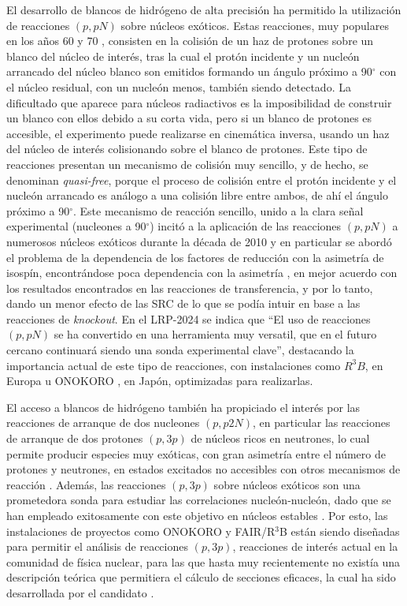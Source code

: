 \documentclass[a4paper,12pt,twoside]{article}
\begin{document}
El desarrollo de blancos de hidrógeno de alta precisión \cite{Obe14,Pan16,Liu23} ha permitido la utilización de reacciones $(p,pN)$ sobre núcleos exóticos. Estas reacciones, muy populares en los años 60 y 70 \cite{Jac66}, consisten en la colisión de un haz de protones sobre un blanco del núcleo de interés, tras la cual el protón incidente y un nucleón arrancado del núcleo blanco son emitidos formando un ángulo próximo a 90$^\circ$ con el núcleo residual, con un nucleón menos, también siendo detectado. La dificultado que aparece para núcleos radiactivos es la imposibilidad de construir un blanco con ellos debido a su corta vida, pero si un blanco de protones es accesible, el experimento puede realizarse en cinemática inversa, usando un haz del núcleo de interés colisionando sobre el blanco de protones. Este tipo de reacciones presentan un mecanismo de colisión muy sencillo, y de hecho, se denominan \textit{quasi-free}, porque el proceso de colisión entre el protón incidente y el nucleón arrancado es análogo a una colisión libre entre ambos, de ahí el ángulo próximo a 90$^\circ$. Este mecanismo de reacción sencillo, unido a la clara señal experimental (nucleones a 90$^\circ$) incitó a la aplicación de las reacciones $(p,pN)$ a numerosos núcleos exóticos durante la década de 2010 \cite{Ata18,Kaw18,Pau19,Hol19} y en particular se abordó el problema de la dependencia de los factores de reducción con la asimetría de isospín, encontrándose poca dependencia con la asimetría \cite{Ata18,Kaw18}, en mejor acuerdo con los resultados encontrados en las reacciones de transferencia, y por lo tanto, dando un menor efecto de las SRC de lo que se podía intuir en base a las reacciones de \textit{knockout}. En el LRP-2024 se indica que ``El uso de reacciones $(p, pN)$ se ha convertido en una herramienta muy versatil, que en el futuro cercano continuará siendo una sonda experimental clave'', destacando la importancia actual de este tipo de reacciones, con instalaciones como $R^3B$, en Europa \cite{r3b24} u ONOKORO \cite{onokoro}, en Japón, optimizadas para realizarlas.

El acceso a blancos de hidrógeno también ha propiciado el interés por las reacciones de arranque de dos nucleones $(p,p2N)$, en particular las reacciones de arranque de dos protones $(p,3p)$ de núcleos ricos en neutrones, lo cual permite producir especies muy exóticas, con gran asimetría entre el número de protones y neutrones, en estados excitados no accesibles con otros mecanismos de reacción \cite{Tan19}. Además, las reacciones $(p,3p)$ sobre núcleos exóticos son una prometedora sonda para estudiar las correlaciones nucleón-nucleón, dado que se han empleado exitosamente con este objetivo en núcleos estables \cite{Pia06}. Por esto, las instalaciones de proyectos como ONOKORO \cite{onokoro} y FAIR/R$^3$B \cite{r3b24,nupecc} están siendo diseñadas para permitir el análisis de reacciones $(p,3p)$, reacciones de interés actual en la comunidad de física nuclear, para las que hasta muy recientemente no existía una descripción teórica que permitiera el cálculo de secciones eficaces, la cual ha sido desarrollada por el candidato \cite{p3p}.
\end{document}
